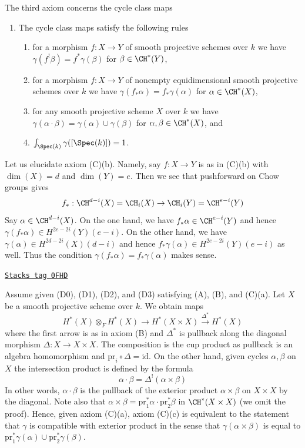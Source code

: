 The third axiom concerns the cycle class maps
\begin{enumerate}
\item[(C)] The cycle class maps satisfy the following rules
\begin{enumerate}
\item for a morphism $f : X \to Y$ of smooth projective schemes over
$k$ we have $\gamma(f^!\beta) = f^*\gamma(\beta)$ for $\beta \in \CH^*(Y)$,
\item for a morphism $f : X \to Y$ of nonempty
equidimensional smooth projective schemes over $k$ we have
$\gamma(f_*\alpha) = f_*\gamma(\alpha)$ for $\alpha \in \CH^*(X)$,
\item for any smooth projective scheme $X$ over $k$ we have
$\gamma(\alpha \cdot \beta) = \gamma(\alpha) \cup \gamma(\beta)$
for $\alpha, \beta \in \CH^*(X)$, and
\item $\int_{\Spec(k)} \gamma([\Spec(k)]) = 1$.
\end{enumerate}
\end{enumerate}
Let us elucidate axiom (C)(b). Namely, say $f : X \to Y$ is
as in (C)(b) with $\dim(X) = d$ and $\dim(Y) = e$. Then we
see that pushforward on Chow groups gives
$$
f_* : \CH^{d - i}(X) = \CH_i(X) \to \CH_i(Y) = \CH^{e - i}(Y)
$$
Say $\alpha \in \CH^{d - i}(X)$. On the one hand, we have
$f_*\alpha \in \CH^{e - i}(Y)$ and hence
$\gamma(f_*\alpha) \in H^{2e - 2i}(Y)(e - i)$.
On the other hand, we have
$\gamma(\alpha) \in H^{2d - 2i}(X)(d - i)$ and hence
$f_*\gamma(\alpha) \in H^{2e - 2i}(Y)(e - i)$ as well.
Thus the condition $\gamma(f_*\alpha) = f_*\gamma(\alpha)$ makes sense.

\begin{remark}
\label{weil-remark-replace-cup-product}
\href{https://stacks.math.columbia.edu/tag/0FHD}{\texttt{Stacks tag 0FHD}}

Assume given (D0), (D1), (D2), and (D3) satisfying (A), (B), and (C)(a).
Let $X$ be a smooth projective scheme over $k$. We obtain maps
$$
H^*(X) \otimes_F H^*(X) \longrightarrow H^*(X \times X)
\xrightarrow{\Delta^*} H^*(X)
$$
where the first arrow is as in axiom (B) and $\Delta^*$
is pullback along the diagonal morphism $\Delta : X \to X \times X$.
The composition is the cup product as pullback is an algebra homomorphism and
$\text{pr}_i \circ \Delta = \text{id}$.
On the other hand, given cycles $\alpha, \beta$ on $X$
the intersection product is defined by the formula
$$
\alpha \cdot \beta =
\Delta^!(\alpha \times \beta)
$$
In other words, $\alpha \cdot \beta$ is the pullback of the
exterior product $\alpha \times \beta$ on $X \times X$ by
the diagonal. Note also that
$\alpha \times \beta = \text{pr}_1^*\alpha \cdot \text{pr}_2^*\beta$
in $\CH^*(X \times X)$ (we omit the proof). Hence, given axiom (C)(a),
axiom (C)(c) is equivalent to the statement that $\gamma$ is
compatible with exterior product in the sense that
$\gamma(\alpha \times \beta)$ is equal to
$\text{pr}_1^*\gamma(\alpha) \cup \text{pr}_2^*\gamma(\beta)$.
\end{remark}

